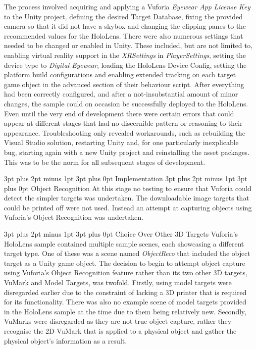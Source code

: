 \documentclass[12pt,a4paper,oneside]{article}
\makeatletter
\renewcommand\paragraph{\@startsection {paragraph}{1}{0mm} %
	                           {3pt plus 2pt minus 1pt} %
	                           {3pt plus 0pt} %
	                           {\normalfont}}
\renewcommand\subsubsection{\@startsection {subsubsection}{1}{0mm} %
	                           {3pt plus 2pt minus 1pt} %
	                           {3pt plus 0pt} %
	                           {\normalfont\bfseries}}
\renewcommand\subsection{\@startsection {subsection}{1}{0mm} %
                               {3pt plus 2pt minus 1pt} %
                               {3pt plus 0pt} %
                               {\large\bfseries}}
\makeatother
\begin{document}
The process involved acquiring and applying a Vuforia \textit{Eyewear App License Key} to the Unity project, defining the desired Target Database, fixing the provided camera so that it did not have a skybox and changing the clipping panes to the recommended values for the HoloLens. There were also numerous settings that needed to be changed or enabled in Unity. These included, but are not limited to, enabling virtual reality support in the \textit{XRSettings} in \textit{PlayerSettings}, setting the device type to \textit{Digital Eyewear}, loading the HoloLens Device Config, setting the platform build configurations and enabling extended tracking on each target game object in the advanced section of their behaviour script.  After everything had been correctly configured, and after a not-insubstantial amount of minor changes, the sample could on occasion be successfully deployed to the HoloLens. Even until the very end of development there were certain errors that could appear at different stages that had no discernible pattern or reasoning to their appearance. Troubleshooting only revealed workarounds, such as rebuilding the Visual Studio solution, restarting Unity and, for one particularly inexplicable bug, starting again with a new Unity project and reinstalling the asset packages. This was to be the norm for all subsequent stages of development.

\subsection{Implementation}
\subsubsection{Object Recognition}
At this stage no testing to ensure that Vuforia could detect the simpler targets was undertaken. The downloadable image targets that could be printed off were not used. Instead an attempt at capturing objects using Vuforia's Object Recognition was undertaken.

\paragraph{Choice Over Other 3D Targets}
Vuforia's HoloLens sample contained multiple sample scenes, each showcasing a different target type. One of these was a scene named \textit{ObjectReco} that included the object target as a Unity game object. The decision to begin to attempt object capture using Vuforia's Object Recognition feature rather than its two other 3D targets, VuMark and Model Targets, was twofold. Firstly, using model targets were disregarded earlier due to the constraint of lacking a 3D printer that is required for its functionality. There was also no example scene of model targets provided in the HoloLens sample at the time due to them being relatively new. Secondly, VuMarks were disregarded as they are not true object capture, rather they recognise the 2D VuMark that is applied to a physical object and gather the physical object's information as a result.
\end{document}
